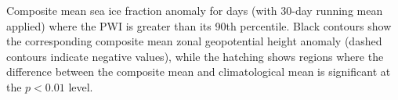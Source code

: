 \label{fig:sic_composite}
Composite mean sea ice fraction anomaly for days (with 30-day running mean applied) where the PWI is greater than its 90th percentile. Black contours show the corresponding composite mean zonal geopotential height anomaly (dashed contours indicate negative values), while the hatching shows regions where the difference between the composite mean and climatological mean is significant at the $p < 0.01$ level.